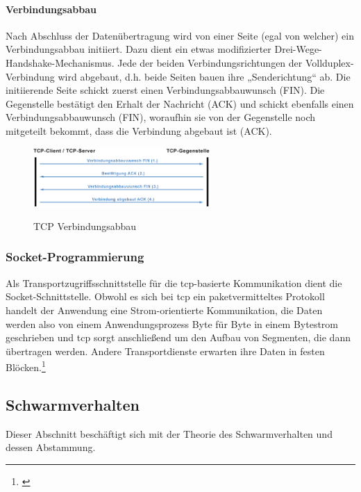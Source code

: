 \paragraph{Verbindungsabbau}
Nach Abschluss der Datenübertragung wird von einer Seite (egal von welcher) ein Verbindungsabbau initiiert. Dazu dient ein etwas modifizierter Drei-Wege-Handshake-Mechanismus. Jede der beiden Verbindungsrichtungen der Vollduplex-Verbindung wird abgebaut, d.h. beide Seiten bauen ihre „Senderichtung“ ab. Die initiierende Seite schickt zuerst einen Verbindungsabbauwunsch (FIN). Die Gegenstelle bestätigt den Erhalt der Nachricht (ACK) und schickt ebenfalls einen Verbindungsabbauwunsch (FIN), woraufhin sie von der Gegenstelle noch mitgeteilt bekommt, dass die Verbindung abgebaut ist (ACK).
\begin{figure}[h]
	\centering
	\includegraphics[width=0.6\textwidth]{images/Verbindungsabbau.png}
	\caption[TCP Verbindungsabbau]{TCP Verbindungsabbau}
	\cite{Schnabel.TCPKommunikation}
	\label{fig:<Sprungmakre>}
\end{figure}
\subsubsection{Socket-Programmierung}
Als Transportzugriffsschnittstelle für die \gls{tcp}-basierte Kommunikation dient die Socket-Schnittstelle.
Obwohl es sich bei \gls{tcp} ein paketvermitteltes Protokoll handelt der Anwendung eine Strom-orientierte Kommunikation, die Daten werden also von einem Anwendungsprozess Byte für Byte in einem Bytestrom geschrieben und \gls{tcp} sorgt anschließend um den Aufbau von Segmenten, die dann übertragen werden. Andere Transportdienste erwarten ihre Daten in festen Blöcken.\footnote{\citep[vgl.][Grundkurs Datenkommunikation, Seite 96 f. f.]{Mandl.GrundkursDatenkommunikation}\label{note67}}

\newpage
\subsection{Schwarmverhalten}

Dieser Abschnitt beschäftigt sich mit der Theorie des Schwarmverhalten und dessen Abstammung.

